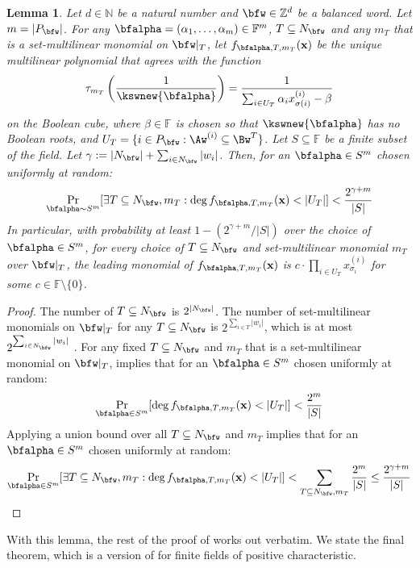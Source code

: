 \documentclass[11pt]{article}
\newtheorem{lemma}[theorem]{Lemma}
\newcommand{\F}{\mathbb{F}}
\begin{document}
\begin{lemma}\label{lem: ght degree lower bound positive char}
Let $d\in \mathbb{N}$ be a natural number and $\bfw \in \mathbb{Z}^d$ be a balanced word. Let $m = |P_\bfw|$. For any $\bfalpha = (\alpha_1, \dots, \alpha_m) \in \F^m$, $T \subseteq N_\bfw$ and any $m_T$ that is a set-multilinear monomial on $\bfw|_T$, let $ f_{\bfalpha,T,m_T}(\mathbf{x})$ be the unique multilinear polynomial that agrees with the function $$\tau_{m_T} \left (\frac{1}{\kswnew{\bfalpha}} \right ) = \frac{1}{\sum_{i\in U_T}{\alpha_ix_{\sigma(i)}^{(i)}}-\beta}$$ on the Boolean cube, where $\beta \in \F$ is chosen so that $\kswnew{\bfalpha}$ has no Boolean roots, and $U_T = \{i \in P_\bfw: \Aw^{(i)} \subseteq \Bw^T\}$. 
Let $S \subseteq \F$ be a finite subset of the field. Let $\gamma := |N_\bfw|+\sum_{i\in N_\bfw}|w_i|$.
Then, for an $\bfalpha \in S^m$ chosen uniformly at random: $$\Pr_{\bfalpha \sim S^m}[\exists T\subseteq N_\bfw, m_T:\deg{f_{\bfalpha,T,m_T}(\mathbf{x})} < |U_T|] < \frac{2^{\gamma+m}}{|S|}$$
In particular, with probability at least $1-(2^{\gamma+m}/|S|)$ over the choice of $\bfalpha \in S^m$, for every choice of $T\subseteq N_\bfw$ and set-multilinear monomial $m_T$ over $\bfw|_T$, the leading monomial of $f_{\bfalpha,T,m_T}(\mathbf{x})$ is $c\cdot\prod_{i\in U_T}x_{\sigma_i}^{(i)}$ for some $c\in\F\setminus\{0\}$.     
\end{lemma}
\begin{proof}
    The number of $T\subseteq N_\bfw$ is $2^{|N_\bfw|}$. The number of set-multilinear monomials on $\bfw|_T$ for any $T\subseteq N_\bfw$ is $2^{\sum_{i\in T}|w_i|}$, which is at most $2^{\sum_{i\in N_\bfw}|w_i|}$ . For any fixed $T \subseteq N_\bfw$ and $m_T$ that is a set-multilinear monomial on $\bfw|_T$,  implies that for an $\bfalpha \in S^m$ chosen uniformly at random: $$\Pr_{\bfalpha \in S^m}[\deg{f_{\bfalpha,T,m_T}(\mathbf{x})} < |U_T|] < \frac{2^{m}}{|S|}$$
    Applying a union bound over all $T \subseteq N_\bfw$ and $m_T$ implies that for an $\bfalpha \in S^m$ chosen uniformly at random: $$\Pr_{\bfalpha \in S^m}[\exists T\subseteq N_\bfw, m_T:\deg{f_{\bfalpha,T,m_T}(\mathbf{x})} < |U_T|] < \sum_{T\subseteq N_\bfw,m_T}\frac{2^{m}}{|S|} \leq \frac{2^{\gamma+m}}{|S|} $$    
\end{proof}

With this lemma, the rest of the proof of \cite{GHT} works out verbatim. We state the final theorem, which is a version of  for finite fields of positive characteristic.
\end{document}
